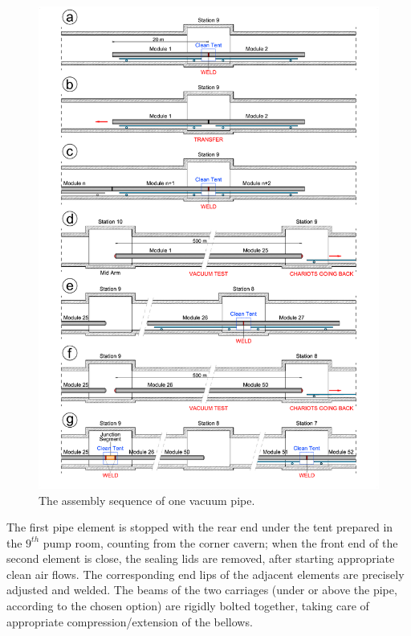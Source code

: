 \begin{figure}
\begin{center}
\includegraphics[width=\textwidth]{Sec_SiteInfra/Figures/VAC8.pdf}
\caption{The assembly sequence of one vacuum pipe.}
\label{fig:VAC8}
\end{center}
\end{figure}

The first pipe element is stopped with the rear end under the tent prepared in the $9^{th}$ pump room, counting from the corner cavern; when the front end of the second element is close, the sealing lids are removed, after starting appropriate clean air flows. The corresponding end lips of the adjacent elements are precisely adjusted and welded. The beams of the two carriages (under or above the pipe, according to the chosen option) are rigidly bolted together, taking care of appropriate compression/extension of the bellows.

